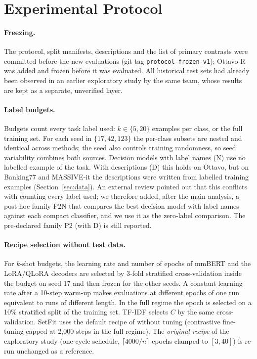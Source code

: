 \section{Experimental Protocol}
\label{sec:protocol}

\paragraph{Freezing.} The protocol, split manifests, descriptions and the list of primary contrasts were committed before the new
evaluations (git tag \texttt{protocol-frozen-v1}); Ottavo-R was added and frozen before it was evaluated. All historical test sets
had already been observed in an earlier exploratory study by the same team, whose results are kept as a separate, unverified layer.

\paragraph{Label budgets.} Budgets count every task label used: $k \in \{5, 20\}$ examples per class, or the full training set. For
each seed in $\{17, 42, 123\}$ the per-class subsets are nested and identical across methods; the seed also controls training
randomness, so seed variability combines both sources. Decision models with label names (N) use no labelled example of the task.
With descriptions (D) this holds on Ottavo, but on Banking77 and MASSIVE-it the descriptions were written from labelled training
examples (Section~\ref{sec:data}). An external review pointed out that this conflicts with counting every label used; we therefore
added, after the main analysis, a post-hoc family P2N that compares the best decision model with label names against each compact
classifier, and we use it as the zero-label comparison. The pre-declared family P2 (with D) is still reported.

\paragraph{Recipe selection without test data.} For $k$-shot budgets, the learning rate and number of epochs of mmBERT and the LoRA/QLoRA
decoders are selected by 3-fold stratified cross-validation inside the budget on seed 17 and then frozen for the other seeds. A constant
learning rate after a 10-step warm-up makes evaluations at different epochs of one run equivalent to runs of different length. In the
full regime the epoch is selected on a 10\% stratified split of the training set. TF-IDF selects $C$ by the same cross-validation.
SetFit uses the default recipe of \citet{tunstall2022setfit} without tuning (contrastive fine-tuning capped at 2{,}000 steps in the full
regime). The \emph{original recipe} of the exploratory study (one-cycle schedule, $\lceil 4000/n \rceil$ epochs clamped to $[3,40]$)
is re-run unchanged as a reference.

